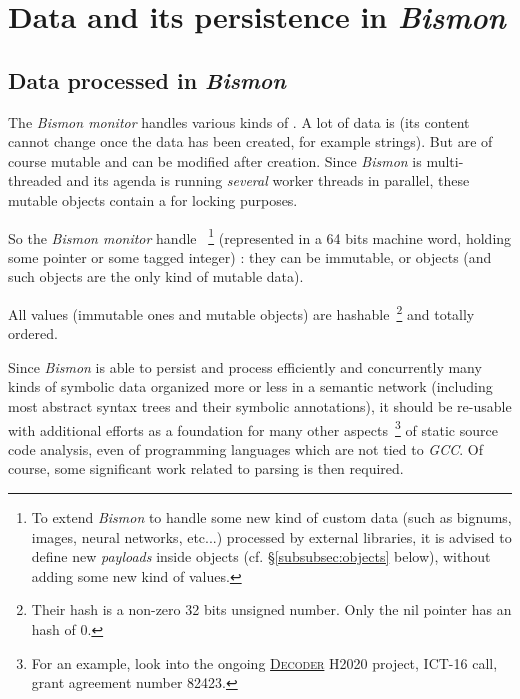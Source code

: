 \section{Data and its persistence in \emph{Bismon}}
\label{sec:datapersist}

\subsection{Data processed in \emph{Bismon}}

\label{subsec:dataproc}

The \emph{Bismon monitor} handles various kinds of
. A lot of data is  (its
content cannot change once the data has been created, for example
strings). But  are of course mutable
and can be modified after creation. Since \emph{Bismon} is
multi-threaded and its agenda is running \emph{several} worker threads
in parallel, these mutable objects contain a  for
locking purposes.

So the \emph{Bismon monitor} handle
~\footnote{To extend \emph{Bismon} to
  handle some new kind of custom data (such as bignums, images, neural
  networks, etc...) processed by external libraries, it is advised to
  define new \emph{payloads} inside objects
  (cf. §\ref{subsubsec:objects} below), without adding some new kind
  of values.} (represented in a 64 bits machine word, holding some
pointer or some tagged integer) : they can be immutable, or objects
(and such objects are the only kind of mutable data).

All values (immutable ones and mutable objects) are
hashable~\footnote{Their hash is a non-zero 32 bits unsigned
  number. Only the nil pointer has an hash of 0.}  and totally
ordered.

\medskip

Since \emph{Bismon} is able to persist and process efficiently and
concurrently many kinds of symbolic data organized more or less in a
semantic network (including most abstract syntax trees and their
symbolic annotations), it should be re-usable with additional efforts
as a foundation for many other aspects~\footnote{For an example, look
  into the ongoing
  \href{https://www.decoder-project.eu/}{\textsc{Decoder}} H2020
  project, ICT-16 call, grant agreement number 82423.} of static
source code analysis, even of programming languages which are not tied
to \emph{GCC}. Of course, some significant work related to parsing is then
required.

